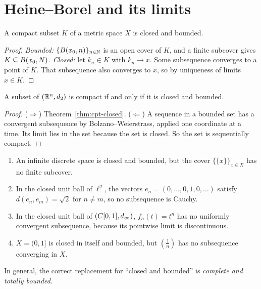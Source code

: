\section{Heine--Borel and its limits}
\begin{theorem}\label{thm:cpt-closed}
A compact subset $K$ of a metric space $X$ is closed and bounded.
\end{theorem}
\begin{proof}
\emph{Bounded:} $\{B(x_0,n)\}_{n\in\mathbb{N}}$ is an open cover of $K$, and a finite subcover gives $K\subseteq B(x_0,N)$.
\emph{Closed:} let $k_n\in K$ with $k_n\to x$. Some subsequence converges to a point of $K$. That subsequence also converges to $x$, so by uniqueness of limits $x\in K$.
\end{proof}

\begin{theorem}\label{thm:heineborel}
A subset of $(\mathbb{R}^n,d_2)$ is compact if and only if it is closed and bounded.
\end{theorem}
\begin{proof}
($\Rightarrow$) Theorem~\ref{thm:cpt-closed}. ($\Leftarrow$) A sequence in a bounded set has a convergent subsequence by Bolzano--Weierstrass, applied one coordinate at a time. Its limit lies in the set because the set is closed. So the set is sequentially compact.
\end{proof}

\begin{warning}
\leavevmode
\begin{enumerate}[label=(\alph*)]
  \item An infinite discrete space is closed and bounded, but the cover $\{\{x\}\}_{x\in X}$ has no finite subcover.
  \item In the closed unit ball of $\ell^2$, the vectors $e_n=(0,\dots,0,1,0,\dots)$ satisfy $d(e_n,e_m)=\sqrt2$ for $n\ne m$, so no subsequence is Cauchy.
  \item In the closed unit ball of $(C[0,1],d_\infty)$, $f_n(t)=t^n$ has no uniformly convergent subsequence, because its pointwise limit is discontinuous.
  \item $X=(0,1]$ is closed in itself and bounded, but $(\frac1n)$ has no subsequence converging in $X$.
\end{enumerate}
In general, the correct replacement for ``closed and bounded'' is \emph{complete and totally bounded}.
\end{warning}

